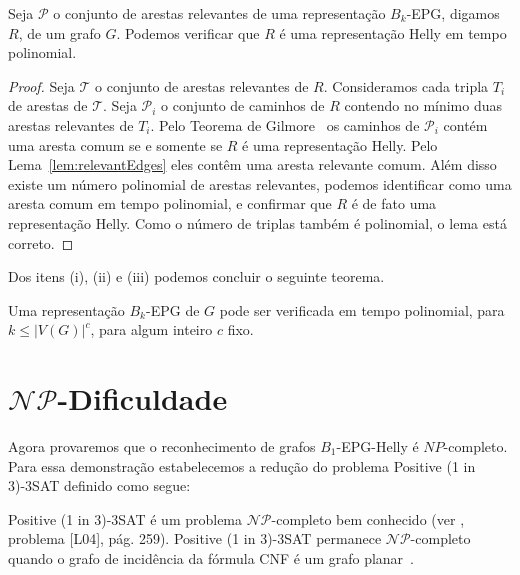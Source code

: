 
\begin{lema}
Seja $\mathcal{P}$ o conjunto de arestas relevantes de uma representação $B_k$-EPG, digamos  $R$, de um grafo  $G$. Podemos verificar que   $R$ é uma representação Helly em tempo polinomial.
\end{lema}

\begin{proof}
Seja $\mathcal{T}$ o conjunto de arestas relevantes de $R$. Consideramos cada tripla $T_i$ de arestas de  $\mathcal{T}$. Seja $\mathcal{P}_i$ o conjunto de caminhos de  $R$ contendo no mínimo duas arestas relevantes de $T_i$. Pelo Teorema de Gilmore~\cite{bergeDuchet1975} os caminhos de $\mathcal{P}_i$ contém uma aresta comum se e somente se  $R$  é uma representação Helly.  Pelo Lema~\ref{lem:relevantEdges} eles contêm uma aresta relevante comum. Além disso existe um número polinomial de arestas relevantes, podemos identificar como uma aresta comum em tempo polinomial, e confirmar que $R$ é de fato uma representação Helly. Como o número de triplas também é polinomial, o lema está correto.
 \end{proof} %

Dos itens (i), (ii) e (iii) podemos concluir o seguinte teorema.

\begin{theorem} \label{teo:npdificuldade}
Uma representação $B_k$-EPG de $G$ pode ser verificada em tempo polinomial, para  $k\leq |V(G)|^c$, para algum inteiro $c$ fixo.
\end{theorem}


\section{$\mathcal{NP}$-Dificuldade}\label{sec:sectionDispositivoClausula}

Agora provaremos que o reconhecimento de grafos   $B_1$-EPG-Helly é $NP$-completo. Para essa demonstração estabelecemos a redução do problema {\sc Positive (1 in 3)-3SAT} definido como segue:



{\sc Positive (1 in 3)-3SAT } é um problema $\mathcal{NP}$-completo bem conhecido (ver \cite{johnson1979}, problema [L04], pág. 259). {\sc Positive (1 in 3)-3SAT} permanece $\mathcal{NP}$-completo quando o grafo de incidência da fórmula CNF é um grafo planar~\cite{mulzer2008minimum}.

